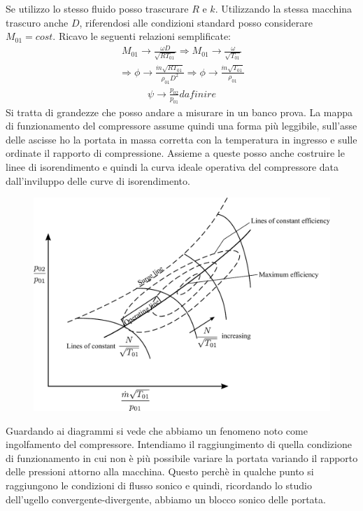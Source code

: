 Se utilizzo lo stesso fluido posso trascurare $R$ e $k$. Utilizzando la stessa macchina trascuro anche $D$, riferendosi alle condizioni standard posso considerare $M_{01}=cost$. Ricavo le seguenti relazioni semplificate:
\begin{align*}
M_{01} \to \frac{\omega D}{\sqrt{R T_{01}}} \Rightarrow M_{01} \to \frac{\omega}{\sqrt{T_{01}}}
\end{align*}
\begin{align*}\Rightarrow
\phi \to \frac{\dot{m} \sqrt{RT_{01}}}{\rho_{01} D^2} \Rightarrow \phi \to \frac{\dot{m} \sqrt{T_{01}}}{\rho_{01}}
\end{align*}
\begin{align*}
\psi \to \frac{p_{02}}{p_{01}}
da finire
\end{align*}
Si tratta di grandezze che posso andare a misurare in un banco prova. 
La mappa di funzionamento del compressore assume quindi una forma più leggibile, sull'asse delle ascisse ho la portata in massa corretta con la temperatura in ingresso e sulle ordinate il rapporto di compressione. Assieme a queste posso anche costruire le linee di isorendimento  e quindi la curva ideale operativa del compressore data dall'inviluppo delle curve di isorendimento.
\begin{figure}
\centering
  \includegraphics[width=.8\textwidth]{fig/secondo_8.pdf}
\caption{}
\label{fig:secondo_8}
\end{figure}
Guardando ai diagrammi si vede che abbiamo un fenomeno noto come ingolfamento del compressore. Intendiamo il raggiungimento di quella condizione di funzionamento in cui non è più possibile variare la portata variando il rapporto delle pressioni attorno alla macchina.
Questo perchè in qualche punto si raggiungono le condizioni di flusso sonico e quindi, ricordando lo studio dell’ugello convergente-divergente, abbiamo un
blocco sonico delle portata.

